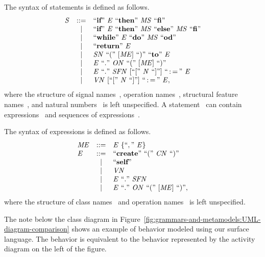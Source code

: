 The syntax of statements is defined as follows.
\[
\begin{array}{lcl}
\it{S} & ::= & ``\textbf{if}"~\it{E}~``\textbf{then}"~\it{MS}~``\textbf{fi}"\\
 & | & ``\textbf{if}"~\it{E}~``\textbf{then}"~\it{MS}~``\textbf{else}"~\it{MS}~``\textbf{fi}"\\
 & | & ``\textbf{while}"~\it{E}~``\textbf{do}"~\it{MS}~``\textbf{od}"\\
 & | & ``\textbf{return}"~\it{E}\\
 & | & \it{SN}~``("~[\it{ME}]~``)"~``\textbf{to}"~\it{E}\\
 & | & \it{E}~``."~\it{ON}~``("~[\it{ME}]~``)"\\
 & | & \it{E}~``."~\it{SFN}~[``["~\it{N}~``]"]~``\operatorname*{:=}"~\it{E}\\
 & | & \it{VN}~[``["~\it{N}~``]"]~``\operatorname*{:=}"~\it{E},
\end{array}
\]
where the structure of signal names~, operation names~, structural feature names~, and natural numbers~ is left unspecified.
A statement~ can contain expressions~ and sequences of expressions~.

The syntax of expressions is defined as follows.
\[
\begin{array}{lcl}
\it{ME} & ::= & \it{E}~\{``,"~\it{E}\}\\
\it{E} & ::= & ``\textbf{create}"~``("~\it{CN}~``)"\\
 & | & ``\textbf{self}"\\
 & | & \it{VN}\\
 & | & \it{E}~``."~\it{SFN}\\
 & | & \it{E}~``."~\it{ON}~``("~[\it{ME}]~``)",
\end{array}
\]
where the structure of class names~ and operation names~ is left unspecified.

The note below the class diagram in Figure~\ref{fig:grammars-and-metamodels:UML-diagram-comparison} shows an example of behavior modeled using our surface language.
The behavior is equivalent to the behavior represented by the activity diagram on the left of the figure.

